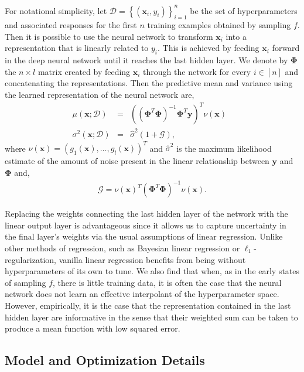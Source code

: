 \documentclass[]{article}
\newcommand{\paren}[1]{\left({#1}\right)}
\newcommand{\brac}[1]{\left[{#1}\right]}
\newcommand{\set}[1]{\left\{{#1}\right\}}
\newcommand{\1}{\mathbf{1}}
\newcommand{\0}{\mathbf{0}}
\newcommand{\x}{\mathbf{x}}
\newcommand{\y}{\mathbf{y}}
\begin{document}
For notational simplicity, let $\mathcal{D} = \set{\paren{\x_i,y_i}}_{i=1}^n$ be the set of hyperparameters and associated responses for the first $n$ training examples obtained by sampling $f$. Then it is possible to use the neural network to transform $\x_i$ into a representation that is linearly related to $y_i$. This is achieved by feeding $\x_i$ forward in the deep neural network until it reaches the last hidden layer. We denote by $\boldsymbol{\Phi}$ the $n\times l$ matrix created by feeding $\x_i$ through the network for every $i\in\brac{n}$ and concatenating the representations. Then the predictive mean and variance using the learned representation of the neural network are,
\begin{eqnarray}
	\mu\paren{\x;\mathcal{D}} &=& \paren{\paren{\boldsymbol{\Phi}^T\boldsymbol{\Phi}}^{-1}\boldsymbol{\Phi}^T\y}^T \nu\paren{\x} ~~~\\
    \sigma^2\paren{\x;\mathcal{D}} &=& \hat{\sigma}^2 \paren{1+\mathcal{G}},
\end{eqnarray}
where $\nu\paren{\x}= \paren{g_1\paren{\x}, \ldots, g_l\paren{\x}}^T$ and $\hat{\sigma}^2$ is the maximum likelihood estimate of the amount of noise present in the linear relationship between $\y$ and $\boldsymbol{\Phi}$ and,
\begin{eqnarray}
	\mathcal{G} = \nu\paren{\x}^T\paren{\boldsymbol{\Phi}^T\boldsymbol{\Phi}}^{-1}\nu\paren{\x}.
\end{eqnarray}
 

Replacing the weights connecting the last hidden layer of the network with the linear output layer is advantageous since it allows us to capture uncertainty in the final layer's weights via the usual assumptions of linear regression. Unlike other methods of regression, such as Bayesian linear regression or $\ell_1$-regularization, vanilla linear regression benefits from being without hyperparameters of its own to tune. We also find that when, as in the early states of sampling $f$, there is little training data, it is often the case that the neural network does not learn an effective interpolant of the hyperparameter space. However, empirically, it is the case that the representation contained in the last hidden layer are informative in the sense that their weighted sum can be taken to produce a mean function with low squared error. 




\subsection{Model and Optimization Details}
\label{sec:mode-and-opti-deta}
\end{document}
